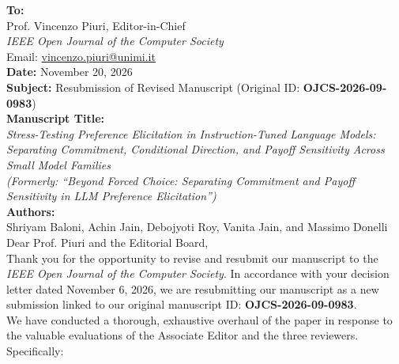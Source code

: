 \documentclass[11pt,a4paper]{article}
\begin{document}
\noindent\textbf{To:}\\
Prof. Vincenzo Piuri, Editor-in-Chief\\
\textit{IEEE Open Journal of the Computer Society}\\
Email: \href{mailto:vincenzo.piuri@unimi.it}{vincenzo.piuri@unimi.it}\\[1.5em]

\noindent\textbf{Date:} November 20, 2026\\[1em]
\noindent\textbf{Subject:} Resubmission of Revised Manuscript (Original ID: \textbf{OJCS-2026-09-0983})\\[1em]
\noindent\textbf{Manuscript Title:}\\
\textit{Stress-Testing Preference Elicitation in Instruction-Tuned Language Models: Separating Commitment, Conditional Direction, and Payoff Sensitivity Across Small Model Families}\\
\textit{(Formerly: ``Beyond Forced Choice: Separating Commitment and Payoff Sensitivity in LLM Preference Elicitation'')}\\[1em]
\noindent\textbf{Authors:}\\
Shriyam Baloni, Achin Jain, Debojyoti Roy, Vanita Jain, and Massimo Donelli\\[1.5em]

\noindent Dear Prof. Piuri and the Editorial Board,\\[0.8em]
Thank you for the opportunity to revise and resubmit our manuscript to the \textit{IEEE Open Journal of the Computer Society}. In accordance with your decision letter dated November 6, 2026, we are resubmitting our manuscript as a new submission linked to our original manuscript ID: \textbf{OJCS-2026-09-0983}.\\[0.8em]
We have conducted a thorough, exhaustive overhaul of the paper in response to the valuable evaluations of the Associate Editor and the three reviewers. Specifically:
\end{document}
